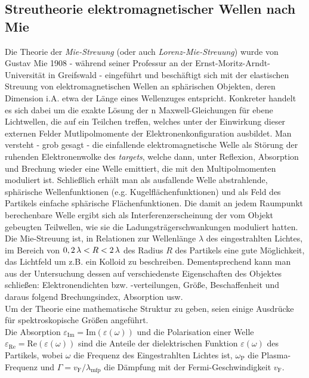 \documentclass[numbers=noenddot,a4paper,notitlepage,twoside,BCOR15mm]{scrartcl}
\newcommand{\ix}[1]{_\text{#1}}
\newcommand{\tilt}[1]{\textit{#1}}
\begin{document}
		\subsection{Streutheorie elektromagnetischer Wellen nach Mie}\label{subsec:miestreu}

			Die Theorie der \tilt{Mie-Streuung} (oder auch \tilt{Lorenz-Mie-Streuung}) wurde von Gustav Mie 1908 - während seiner Professur an der Ernst-Moritz-Arndt-Universität in Greifswald - eingeführt und beschäftigt sich mit der elastischen Streuung von elektromagnetischen Wellen an sphärischen Objekten, deren Dimension i.A. etwa der Länge eines Wellenzuges entspricht. Konkreter handelt es sich dabei um die exakte Lösung der n Maxwell-Gleichungen für ebene Lichtwellen, die auf ein Teilchen treffen, welches unter der Einwirkung dieser externen Felder Mutlipolmomente der Elektronenkonfiguration ausbildet. Man versteht - grob gesagt - die einfallende elektromagnetische Welle als Störung der ruhenden Elektronenwolke des \tilt{targets}, welche dann, unter Reflexion, Absorption und Brechung wieder eine Welle emittiert, die mit den Multipolmomenten moduliert ist. Schließlich erhält man als ausfallende Welle abstrahlende, sphärische Wellenfunktionen (e.g. Kugelflächenfunktionen) und als Feld des Partikels einfache sphärische Flächenfunktionen. Die damit an jedem Raumpunkt berechenbare Welle ergibt sich als Interferenzerscheinung der vom Objekt gebeugten Teilwellen, wie sie die Ladungsträgerschwankungen moduliert hatten.\\
			Die Mie-Streuung ist, in Relationen zur Wellenlänge $\lambda$ des eingestrahlten Lichtes, im Bereich von $\unit[0,2]{\lambda}<R<\unit[2]{\lambda}$ des Radius $R$ des Partikels eine gute Möglichkeit, das Lichtfeld um z.B. ein Kolloid zu beschreiben. Dementsprechend kann man aus der Untersuchung dessen auf verschiedenste Eigenschaften des Objektes schließen: Elektronendichten bzw. -verteilungen, Größe, Beschaffenheit und daraus folgend Brechungsindex, Absorption usw.\\
			Um der Theorie eine mathematische Struktur zu geben, seien einige Ausdrücke für spektroskopische Größen angeführt.\\
			Die Absorption $\varepsilon\ix{Im}=\text{Im}\left(\varepsilon\left(\omega\right)\right)$ und die Polarisation einer Welle $\varepsilon\ix{Re}=\text{Re}\left(\varepsilon\left(\omega\right)\right)$ sind die Anteile der dielektrischen Funktion $\varepsilon\left(\omega\right)$ des Partikels, wobei $\omega$ die Frequenz des Eingestrahlten Lichtes ist, $\omega\ix{P}$ die Plasma-Frequenz und $\Gamma=v\ix{F}/\lambda\ix{mfp}$ die Dämpfung mit der Fermi-Geschwindigkeit $v\ix{F}$.
\end{document}
